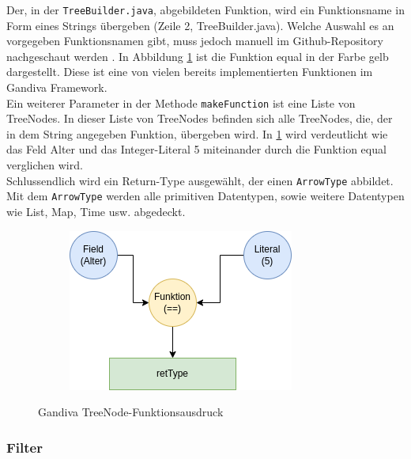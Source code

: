 Der, in der \texttt{TreeBuilder.java}, abgebildeten Funktion, wird ein Funktionsname in Form eines Strings übergeben (Zeile 2, TreeBuilder.java). Welche Auswahl es an vorgegeben Funktionsnamen gibt, muss jedoch manuell im Github-Repository nachgeschaut werden \cite{Github:Arrow:functionregistry}. In Abbildung \ref{graf_5} ist die Funktion \glqq{}equal\grqq{} in der Farbe gelb dargestellt. Diese ist eine von vielen bereits implementierten Funktionen im Gandiva Framework.\\

Ein weiterer Parameter in der Methode \texttt{makeFunction} ist eine Liste von TreeNodes.
In dieser Liste von TreeNodes befinden sich alle TreeNodes, die, der in dem String angegeben Funktion, übergeben wird.
In \ref{graf_5} wird verdeutlicht wie das Feld \glq{}Alter\grq{} und das Integer-Literal \glq{}5\grq{} miteinander durch die Funktion \glq{}equal\grq{} verglichen wird. \\
Schlussendlich wird ein Return-Type ausgewählt, der einen \texttt{ArrowType} abbildet. Mit dem \texttt{ArrowType} werden alle primitiven Datentypen, sowie weitere Datentypen wie \glqq{}List, Map, Time\grqq{} usw. abgedeckt.

\begin{figure}[h]
  \centering
  \begin{subfigure}[b]{0.5\textwidth}
    \includegraphics[width=1.0\linewidth]{img/gandiva_funktion}
  \end{subfigure}
  \caption{Gandiva TreeNode-Funktionsausdruck}
  \label{graf_5}
\end{figure}

\subsubsection{Filter}

